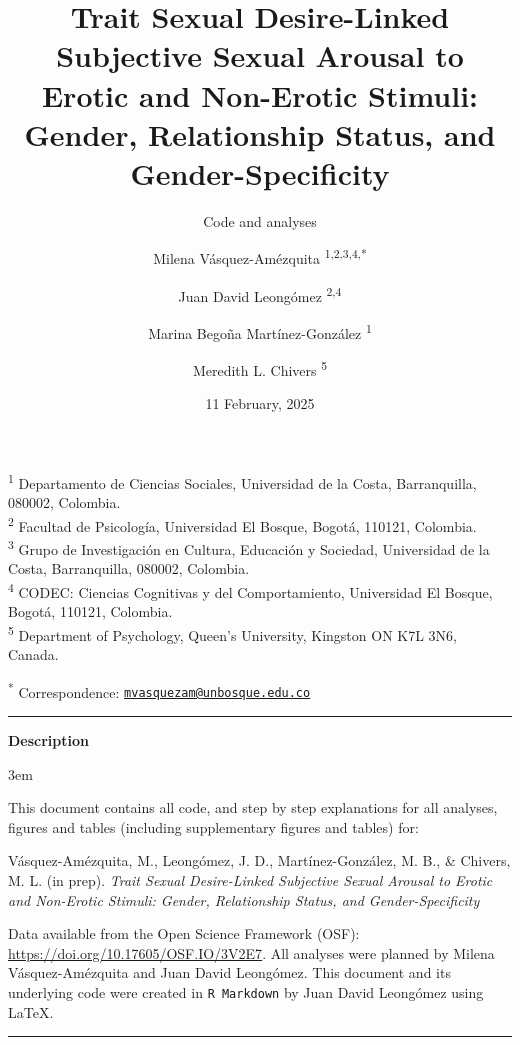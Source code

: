 \documentclass[
  bookmarksnumbered]{article}
\title{Trait Sexual Desire-Linked Subjective Sexual Arousal to Erotic and Non-Erotic Stimuli: Gender, Relationship Status, and Gender-Specificity}
\subtitle{Code and analyses}
\author{Milena Vásquez-Amézquita \orcidlink{0000-0001-7317-8430}\textsuperscript{1,2,3,4,*} \and Juan David Leongómez \orcidlink{0000-0002-0092-6298}\textsuperscript{2,4} \and Marina Begoña Martínez-González \orcidlink{0000-0002-5840-6383}\textsuperscript{1} \and Meredith L. Chivers \orcidlink{0000-0002-5495-9263}\textsuperscript{5}}
\date{11 February, 2025}
\begin{document}
\maketitle

\textsuperscript{1} Departamento de Ciencias Sociales, Universidad de la Costa, Barranquilla, 080002, Colombia.\\
\textsuperscript{2} Facultad de Psicología, Universidad El Bosque, Bogotá, 110121, Colombia.\\
\textsuperscript{3} Grupo de Investigación en Cultura, Educación y Sociedad, Universidad de la Costa, Barranquilla, 080002, Colombia.\\
\textsuperscript{4} CODEC: Ciencias Cognitivas y del Comportamiento, Universidad El Bosque, Bogotá, 110121, Colombia.\\
\textsuperscript{5} Department of Psychology, Queen's University, Kingston ON K7L 3N6, Canada.

\textsuperscript{*} Correspondence: \href{mailto:mvasquezam@unbosque.edu.co}{\href{mailto:mvasquezam@unbosque.edu.co}{\nolinkurl{mvasquezam@unbosque.edu.co}}}

\begin{center}\rule{0.5\linewidth}{0.5pt}\end{center}

\begin{center}
\textbf{Description}
\end{center}

\par
\begingroup
\leftskip3em
\rightskip\leftskip

This document contains all code, and step by step explanations for all analyses, figures and tables (including supplementary figures and tables) for:

\begin{hangparas}{.25in}{1}
Vásquez-Amézquita, M., Leongómez, J. D., Martínez-González, M. B., \& Chivers, M. L. (in prep). \textit{Trait Sexual Desire-Linked Subjective Sexual Arousal to Erotic and Non-Erotic Stimuli: Gender, Relationship Status, and Gender-Specificity}
\end{hangparas}

Data available from the Open Science Framework (OSF): \url{https://doi.org/10.17605/OSF.IO/3V2E7}. All analyses were planned by Milena Vásquez-Amézquita and Juan David Leongómez. This document and its underlying code were created in \texttt{R\ Markdown} by Juan David Leongómez using \LaTeX.

\begin{center}\rule{0.5\linewidth}{0.5pt}\end{center}
\end{document}
